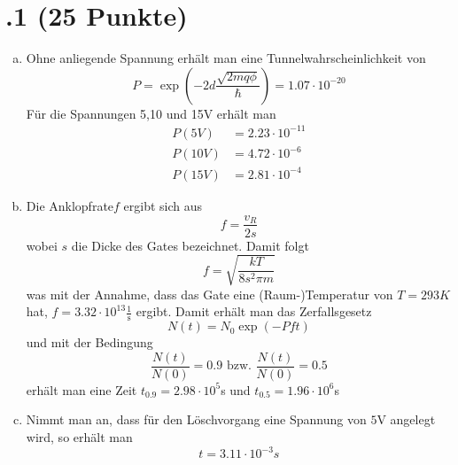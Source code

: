 \section*{\nr.1 \titone (25 Punkte)}
\begin{enumerate}[(a)]
\item Ohne anliegende Spannung erhält man eine Tunnelwahrscheinlichkeit von
\begin{equation}
  P=\exp\left(-2d \frac{\sqrt{2mq\phi}}{\hbar}\right)=1.07\cdot 10^{-20}
\end{equation}
Für die Spannungen 5,10 und 15V erhält man
\begin{align}
  P(5V)&=2.23\cdot 10^{-11}\\
  P(10V)&=4.72\cdot 10^{-6}\\
  P(15V)&=2.81\cdot 10^{-4}
\end{align}
\item Die \glqq Anklopfrate\grqq $f$ ergibt sich aus
\begin{equation}
  f=\frac{v_{R}}{2s}
\end{equation}
wobei $s$ die Dicke des Gates bezeichnet. Damit folgt
\begin{equation}
  f=\sqrt{\frac{kT}{8s^2\pi m}}
\end{equation}
was mit der Annahme, dass das Gate eine (Raum-)Temperatur von $T=293K$ hat, $f=3.32\cdot 10^{13}\frac{1}{\mathrm{s}}$ ergibt.
Damit erhält man das Zerfallsgesetz
\begin{equation}
  N(t)=N_0\exp\left(-Pft\right)
\end{equation}
und mit der Bedingung 
\begin{equation}
  \frac{N(t)}{N(0)}=0.9 \,\,\mathrm{bzw.} \,\, \frac{N(t)}{N(0)}=0.5 
\end{equation}
erhält man eine Zeit $t_{0.9}=2.98\cdot 10^{5}$s und $t_{0.5}=1.96\cdot 10^{6}$s
\item Nimmt man an, dass für den Löschvorgang eine Spannung von $5$V angelegt wird, so erhält man 
\begin{equation}
  t=3.11\cdot 10^{-3}s
\end{equation}
\end{enumerate}